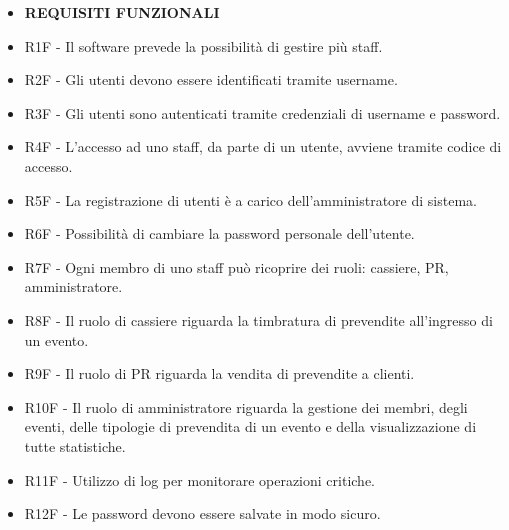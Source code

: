 \documentclass[a4paper]{article}
\begin{document}
\begin{itemize}
	
	\item \textbf{REQUISITI FUNZIONALI}
		
	\item R1F - Il software prevede la possibilità di gestire più staff.
	
	
	\item R2F - Gli utenti devono essere identificati tramite username.
	
	\item R3F - Gli utenti sono autenticati tramite credenziali di username e password.
	\item R4F - L'accesso ad uno staff, da parte di un utente, avviene tramite codice di accesso.	

	\item R5F - La registrazione di utenti è a carico dell'amministratore di sistema.
	\item R6F - Possibilità di cambiare la password personale dell'utente.
		
	\item R7F - Ogni membro di uno staff può ricoprire dei ruoli: cassiere, PR, amministratore.	
	\item R8F - Il ruolo di cassiere riguarda la timbratura di prevendite all'ingresso di un evento.
	\item R9F - Il ruolo di PR riguarda la vendita di prevendite a clienti.
	\item R10F - Il ruolo di amministratore riguarda la gestione dei membri, degli eventi, delle tipologie di prevendita di un evento e della visualizzazione di tutte statistiche.
	
	\item R11F - Utilizzo di log per monitorare operazioni critiche.

	\item R12F - Le password devono essere salvate in modo sicuro.
	
	
	

\end{itemize}
\end{document}
